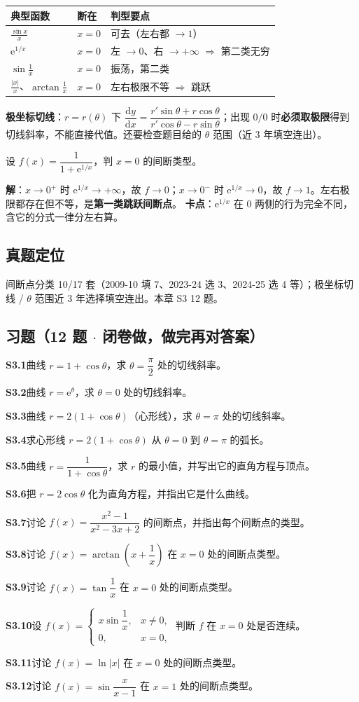 \documentclass[11pt,a4paper]{ctexart}
\newcommand{\abs}[1]{\left\lvert #1\right\rvert}
\newcommand{\ee}{\mathrm{e}}
\newcommand{\D}{\mathrm{d}}
\newcommand{\q}[2]{\par\medskip\noindent\textbf{#1}\quad #2\par}
\begin{document}
\begin{center}
\begin{tabular}{@{}p{4.2cm}p{5.0cm}p{6.0cm}@{}}
\toprule
\textbf{典型函数} & \textbf{断在} & \textbf{判型要点} \\
\midrule
$\frac{\sin x}{x}$ & $x=0$ & 可去（左右都 $\to1$） \\
$\ee^{1/x}$ & $x=0$ & 左 $\to0$、右 $\to+\infty$ $\Rightarrow$ 第二类无穷 \\
$\sin\frac1x$ & $x=0$ & 振荡，第二类 \\
$\frac{\abs{x}}{x}$、$\arctan\frac1x$ & $x=0$ & 左右极限不等 $\Rightarrow$ 跳跃 \\
\bottomrule
\end{tabular}
\end{center}

\noindent\textbf{极坐标切线}：$r=r(\theta)$ 下 $\dfrac{\D y}{\D x}=\dfrac{r'\sin\theta+r\cos\theta}{r'\cos\theta-r\sin\theta}$；出现 $0/0$ 时\textbf{必须取极限}得到切线斜率，不能直接代值。还要检查题目给的 $\theta$ 范围（近 3 年填空连出）。

\begin{keypoint}[例题精讲 $\cdot$ $\ee^{1/x}$ 型]
设 $f(x)=\dfrac{1}{1+\ee^{1/x}}$，判 $x=0$ 的间断类型。

\noindent\textbf{解}：$x\to0^+$ 时 $\ee^{1/x}\to+\infty$，故 $f\to0$；$x\to0^-$ 时 $\ee^{1/x}\to0$，故 $f\to1$。左右极限都存在但不等，是\textbf{第一类跳跃间断点}。
\textbf{卡点}：$\ee^{1/x}$ 在 $0$ 两侧的行为完全不同，含它的分式一律分左右算。
\end{keypoint}

\subsection{真题定位}
间断点分类 10/17 套（2009-10 填 7、2023-24 选 3、2024-25 选 4 等）；极坐标切线 / $\theta$ 范围近 3 年选择填空连出。本章 S3 12 题。

\subsection{习题（12 题 $\cdot$ 闭卷做，做完再对答案）}
\q{S3.1}{曲线 $r=1+\cos\theta$，求 $\theta=\dfrac{\pi}{2}$ 处的切线斜率。}
\q{S3.2}{曲线 $r=\ee^{\theta}$，求 $\theta=0$ 处的切线斜率。}
\q{S3.3}{曲线 $r=2(1+\cos\theta)$（心形线），求 $\theta=\pi$ 处的切线斜率。}
\q{S3.4}{求心形线 $r=2(1+\cos\theta)$ 从 $\theta=0$ 到 $\theta=\pi$ 的弧长。}
\q{S3.5}{曲线 $r=\dfrac{1}{1+\cos\theta}$，求 $r$ 的最小值，并写出它的直角方程与顶点。}
\q{S3.6}{把 $r=2\cos\theta$ 化为直角方程，并指出它是什么曲线。}
\q{S3.7}{讨论 $f(x)=\dfrac{x^{2}-1}{x^{2}-3x+2}$ 的间断点，并指出每个间断点的类型。}
\q{S3.8}{讨论 $f(x)=\arctan\left(x+\dfrac{1}{x}\right)$ 在 $x=0$ 处的间断点类型。}
\q{S3.9}{讨论 $f(x)=\tan\dfrac{1}{x}$ 在 $x=0$ 处的间断点类型。}
\q{S3.10}{设 $f(x)=\begin{cases}x\sin\dfrac{1}{x},&x\neq0,\\ 0,&x=0,\end{cases}$ 判断 $f$ 在 $x=0$ 处是否连续。}
\q{S3.11}{讨论 $f(x)=\ln|x|$ 在 $x=0$ 处的间断点类型。}
\q{S3.12}{讨论 $f(x)=\sin\dfrac{x}{x-1}$ 在 $x=1$ 处的间断点类型。}
\end{document}
